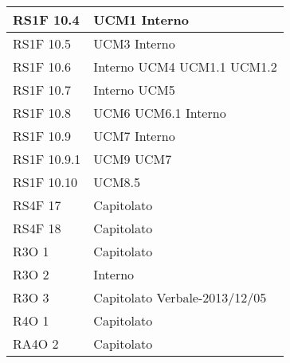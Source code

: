 \begin{center}
\begin{longtable}{ | p{5cm} | p{5cm} |}
        RS1F 10.4 &  UCM1 \newline  Interno \newline  \\ \hline      
        RS1F 10.5 &  UCM3 \newline  Interno \newline  \\ \hline      
        RS1F 10.6 &  Interno \newline  UCM4 \newline  UCM1.1 \newline  UCM1.2 \newline  \\ \hline      
        RS1F 10.7 &  Interno \newline  UCM5 \newline  \\ \hline      
        RS1F 10.8 &  UCM6 \newline  UCM6.1 \newline  Interno \newline  \\ \hline      
        RS1F 10.9 &  UCM7 \newline  Interno \newline  \\ \hline      
        RS1F 10.9.1 &  UCM9 \newline  UCM7 \newline  \\ \hline      
        RS1F 10.10 &  UCM8.5 \newline  \\ \hline      
        RS4F 17 &  Capitolato \newline  \\ \hline      
        RS4F 18 &  Capitolato \newline  \\ \hline      
        R3O 1 &  Capitolato \newline  \\ \hline      
        R3O 2 &  Interno \newline  \\ \hline      
        R3O 3 &  Capitolato \newline  Verbale-2013/12/05 \newline  \\ \hline      
        R4O 1 &  Capitolato \newline  \\ \hline      
        RA4O 2 &  Capitolato \newline  \\ \hline      

\end{longtable}
\end{center}
